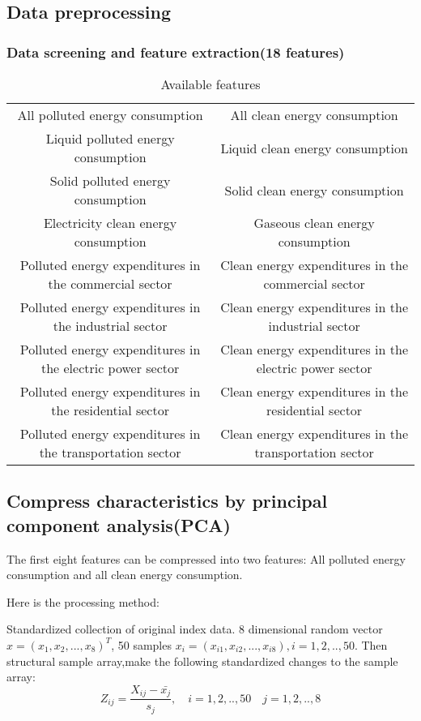 \documentclass[a4paper]{article}
\begin{document}
\subsection{Data preprocessing}
\subsubsection{Data screening and feature extraction(18 features)}

\begin{table}[H]
\centering
\begin{tabular}{cc}
\midrule
All polluted energy consumption& All clean energy consumption\\
Liquid polluted energy consumption& Liquid clean energy consumption\\
Solid polluted energy consumption& Solid clean energy consumption\\
Electricity clean energy consumption& Gaseous clean energy consumption\\
Polluted energy  expenditures in the commercial sector& Clean energy  expenditures in the commercial sector \\
Polluted energy  expenditures in the industrial sector &  Clean energy  expenditures in the industrial  sector\\
Polluted energy  expenditures in the electric power sector & Clean energy  expenditures in the electric power sector \\
Polluted energy  expenditures in the residential sector & Clean energy  expenditures in the residential sector \\
Polluted energy  expenditures in the transportation sector&Clean energy  expenditures in the transportation sector\\
\bottomrule
\end{tabular}
\caption{Available features}\label{tab:aStrangeTable}
\end{table}

\subsection{Compress characteristics by principal component analysis(PCA)}

The first eight features can be compressed into two features: All polluted energy consumption and all clean energy consumption.

Here is the processing method\cite{pca}:

Standardized collection of original index data.
8 dimensional random vector $x = (x_1, x_2, ..., x_8)^{T}$, 50 samples $x_i = (x_{i1}, x_{i2}, ...,x_{i8}), i=1,2,..,50$. Then structural sample array,make the following standardized changes to the sample array:\[
Z_{ij}=\frac{X_{ij}-\bar{x_j}}{s_j},\quad i = 1, 2,..,50 \quad j = 1, 2, ..,8
\]
\end{document}
